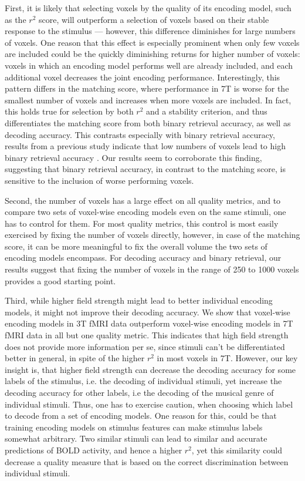 First, it is likely that selecting voxels by the quality of its encoding model, such as the $r^{2}$ score, will outperform a selection of voxels based on their stable response to the stimulus --- however, this difference diminishes for large numbers of voxels. One reason that this effect is especially prominent when only few voxels are included could be the quickly diminishing returns for higher number of voxels: voxels in which  an encoding model performs well are already included, and each additional voxel decreases the joint encoding performance. Interestingly, this pattern differs in the matching score, where performance in 7T is worse for the smallest number of voxels and increases when more voxels are included. In fact, this holds true for selection by both $r^{2}$ and a stability criterion, and thus differentiates the matching score from both binary retrieval accuracy, as well as decoding accuracy. This contrasts especially with binary retrieval accuracy, results from a previous study indicate that low numbers of voxels lead to high binary retrieval accuracy \citep{hoefle2018identifying}. Our results seem to corroborate this finding, suggesting that binary retrieval accuracy, in contrast to the matching score, is sensitive to the inclusion of worse performing voxels.

Second, the number of voxels has a large effect on all quality metrics, and to compare two sets of voxel-wise encoding models even on the same stimuli, one has to control for them. For most quality metrics, this control is most easily exercised by fixing the number of voxels directly, however, in case of the matching score, it can be more meaningful to fix the overall volume the two sets of encoding models encompass.
For decoding accuracy and binary retrieval, our results suggest that fixing the number of voxels in the range of 250 to 1000 voxels provides a good starting point.

Third, while higher field strength might lead to better individual encoding models, it might not improve their decoding accuracy. We show that voxel-wise encoding models in 3T f{MRI} data outperform voxel-wise encoding models in 7T f{MRI} data in all but one quality metric. This indicates that high field strength does not provide more information per se, since stimuli can't be differentiated better in general, in spite of the higher $r^{2}$ in most voxels in 7T. However, our key insight is, that higher field strength can decrease the decoding accuracy for some labels of the stimulus, i.e. the decoding of individual stimuli, yet increase the decoding accuracy for other labels, i.e the decoding of the musical genre of individual stimuli. Thus, one has to exercise caution, when choosing which label to decode from a set of encoding models. One reason for this, could be that training encoding models on stimulus features can make stimulus labels somewhat arbitrary. Two similar stimuli can lead to similar and accurate predictions of BOLD activity, and hence a higher $r^{2}$,  yet this similarity could decrease a quality measure that is based on the correct discrimination between individual stimuli.

